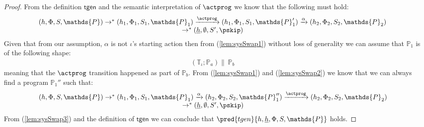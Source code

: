 \begin{lem}
\begin{proof}
	From the definition $\mathsf{tgen}$ and the semantic interpretation of $\actprog$ we know that the following must hold:
	\begin{gather}
		\label{lem:sysSwap1}
		\begin{array}{c}
			(h, \Phi, S, \mathds{P}) \rightarrow^* (h_1, \Phi_1, S_1, \mathds{P}_1) \xrightarrow{\actprog} (h_1, \Phi_1, S_1, \mathds{P}_1') \xrightarrow{\alpha} (h_2, \Phi_2, S_2, \mathds{P}_2) \\ \rightarrow^* (\underline{h}, \emptyset, S', \pskip)
		\end{array}
	\end{gather}
	Given that from our assumption, $\alpha$ is not $\iota$'s starting action then from (\ref{lem:sysSwap1}) without loss of generality we can assume that $\mathds{P}_1$ is of the following shape:
	\begin{gather}
		\label{lem:sysSwap2}
		\left( \mathds{T}_\iota ; \mathds{P}_a \right) \|\ \mathds{P}_b
	\end{gather}
	meaning that the $\actprog$ transition happened as part of $\mathds{P}_b$. From (\ref{lem:sysSwap1}) and (\ref{lem:sysSwap2}) we know that we can always find a program $\mathds{P}_1''$ such that:
	\begin{gather}
		\label{lem:sysSwap3}
		\begin{array}{c}
			(h, \Phi, S, \mathds{P}) \rightarrow^* (h_1, \Phi_1, S_1, \mathds{P}_1) \xrightarrow{\alpha} (h_2, \Phi_2, S_2, \mathds{P}_1'') \xrightarrow{\actprog} (h_2, \Phi_2, S_2, \mathds{P}_2) \\ \rightarrow^* (\underline{h}, \emptyset, S', \pskip)
		\end{array}
	\end{gather}
	From (\ref{lem:sysSwap3}) and the definition of $\mathsf{tgen}$ we can conclude that $\pred{tgen}{h, \underline{h}, \Phi, S, \mathds{P}}$ holds.
	\end{proof}
\end{lem}

